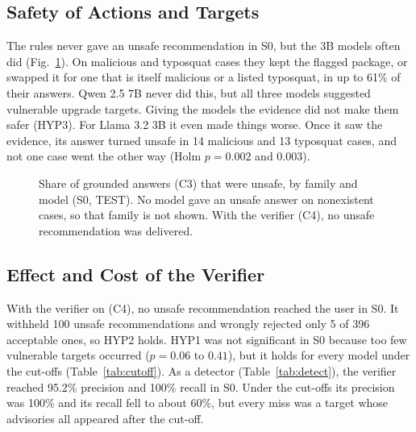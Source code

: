 \documentclass[conference]{IEEEtran}
\begin{document}
\subsection{Safety of Actions and Targets}
The rules never gave an unsafe recommendation in S0, but the 3B models often did
(Fig.~\ref{fig:unsafe}). On malicious and typosquat cases they kept the flagged package, or swapped it for one that
is itself malicious or a listed typosquat, in up to 61\% of their answers. Qwen 2.5 7B never did this, but all three
models suggested vulnerable upgrade targets. Giving the models the evidence did not make them safer (HYP3). For
Llama 3.2 3B it even made things worse. Once it saw the evidence, its answer turned unsafe in 14 malicious and 13
typosquat cases, and not one case went the other way (Holm $p=0.002$ and $0.003$).

\begin{figure}[t]
\centering
{}
\caption{Share of grounded answers (C3) that were unsafe, by family and model (S0, TEST). No model gave an unsafe
answer on nonexistent cases, so that family is not shown. With the verifier (C4), no unsafe recommendation was
delivered.}
\label{fig:unsafe}
\end{figure}



\subsection{Effect and Cost of the Verifier}
With the verifier on (C4), no unsafe recommendation reached the user in S0. It withheld 100
unsafe recommendations and wrongly rejected only 5 of 396 acceptable ones, so HYP2 holds. HYP1 was not significant
in S0 because too few vulnerable targets occurred ($p=0.06$ to $0.41$), but it holds for every model under the
cut-offs (Table~\ref{tab:cutoff}). As a detector (Table~\ref{tab:detect}), the verifier reached 95.2\% precision and
100\% recall in S0. Under the cut-offs its precision was 100\% and its recall fell to about 60\%, but every miss was
a target whose advisories all appeared after the cut-off.
\end{document}
